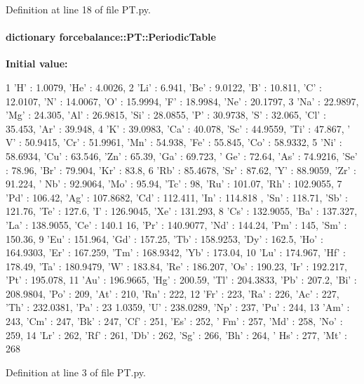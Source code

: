 \-Definition at line 18 of file \-P\-T.\-py.

\hypertarget{namespaceforcebalance_1_1PT_aa2d0659df85804d6f36a4a2d9d4f463a}{
\paragraph[{\-Periodic\-Table}]{\setlength{\rightskip}{0pt plus 5cm}dictionary {\bf forcebalance\-::\-P\-T\-::\-Periodic\-Table}}}\label{namespaceforcebalance_1_1PT_aa2d0659df85804d6f36a4a2d9d4f463a}
{\bfseries \-Initial value\-:}
\begin{DoxyCode}
1 {'H' : 1.0079, 'He' : 4.0026, 
2                  'Li' : 6.941, 'Be' : 9.0122, 'B' : 10.811, 'C' : 12.0107, 'N' 
      : 14.0067, 'O' : 15.9994, 'F' : 18.9984, 'Ne' : 20.1797,
3                  'Na' : 22.9897, 'Mg' : 24.305, 'Al' : 26.9815, 'Si' : 28.0855,
       'P' : 30.9738, 'S' : 32.065, 'Cl' : 35.453, 'Ar' : 39.948, 
4                  'K' : 39.0983, 'Ca' : 40.078, 'Sc' : 44.9559, 'Ti' : 47.867, '
      V' : 50.9415, 'Cr' : 51.9961, 'Mn' : 54.938, 'Fe' : 55.845, 'Co' : 58.9332, 
5                  'Ni' : 58.6934, 'Cu' : 63.546, 'Zn' : 65.39, 'Ga' : 69.723, '
      Ge' : 72.64, 'As' : 74.9216, 'Se' : 78.96, 'Br' : 79.904, 'Kr' : 83.8, 
6                  'Rb' : 85.4678, 'Sr' : 87.62, 'Y' : 88.9059, 'Zr' : 91.224, '
      Nb' : 92.9064, 'Mo' : 95.94, 'Tc' : 98, 'Ru' : 101.07, 'Rh' : 102.9055, 
7                  'Pd' : 106.42, 'Ag' : 107.8682, 'Cd' : 112.411, 'In' : 114.818
      , 'Sn' : 118.71, 'Sb' : 121.76, 'Te' : 127.6, 'I' : 126.9045, 'Xe' : 131.293, 
8                  'Cs' : 132.9055, 'Ba' : 137.327, 'La' : 138.9055, 'Ce' : 140.1
      16, 'Pr' : 140.9077, 'Nd' : 144.24, 'Pm' : 145, 'Sm' : 150.36, 
9                  'Eu' : 151.964, 'Gd' : 157.25, 'Tb' : 158.9253, 'Dy' : 162.5, 
      'Ho' : 164.9303, 'Er' : 167.259, 'Tm' : 168.9342, 'Yb' : 173.04, 
10                  'Lu' : 174.967, 'Hf' : 178.49, 'Ta' : 180.9479, 'W' : 183.84, 
      'Re' : 186.207, 'Os' : 190.23, 'Ir' : 192.217, 'Pt' : 195.078, 
11                  'Au' : 196.9665, 'Hg' : 200.59, 'Tl' : 204.3833, 'Pb' : 207.2,
       'Bi' : 208.9804, 'Po' : 209, 'At' : 210, 'Rn' : 222, 
12                  'Fr' : 223, 'Ra' : 226, 'Ac' : 227, 'Th' : 232.0381, 'Pa' : 23
      1.0359, 'U' : 238.0289, 'Np' : 237, 'Pu' : 244, 
13                  'Am' : 243, 'Cm' : 247, 'Bk' : 247, 'Cf' : 251, 'Es' : 252, '
      Fm' : 257, 'Md' : 258, 'No' : 259, 
14                  'Lr' : 262, 'Rf' : 261, 'Db' : 262, 'Sg' : 266, 'Bh' : 264, '
      Hs' : 277, 'Mt' : 268}
\end{DoxyCode}


\-Definition at line 3 of file \-P\-T.\-py.

